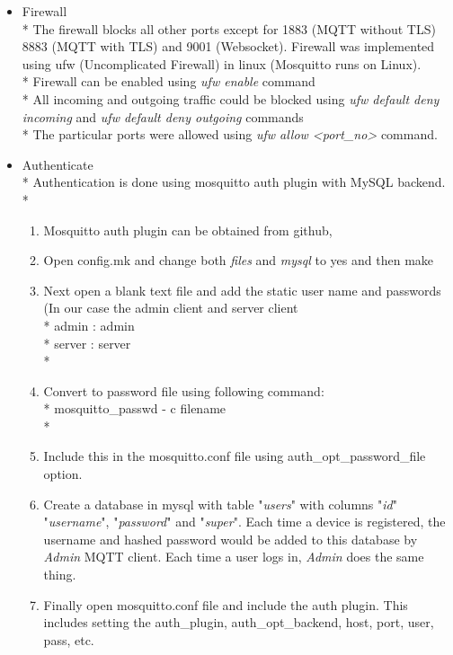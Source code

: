 \documentclass{report}
\begin{document}
\begin{itemize}
    \item Firewall \\* 
    The firewall blocks all other ports except for 1883 (MQTT without TLS) 8883 (MQTT with TLS) and 9001 (Websocket). Firewall was implemented using ufw (Uncomplicated Firewall) in linux (Mosquitto runs on Linux).\\*
    Firewall can be enabled using \textit{ufw enable} command\\*
    All incoming and outgoing traffic could be blocked using \textit{ufw default deny incoming} and \textit{ufw default deny outgoing} commands\\*
    The particular ports were allowed using \textit{ufw allow <port\_no>} command.
    \item Authenticate\\* 
    Authentication is done using mosquitto auth plugin with MySQL backend.\\*
    \begin{enumerate}
        \item Mosquitto auth plugin can be obtained from github,
        \item Open config.mk and change both \textit{files} and \textit{mysql} to yes and then make
        \item Next open a blank text file and add the static user name and passwords (In our case the admin client and server client\\*
        \hspace*{2cm}admin : admin\\*
        \hspace*{2cm}server : server\\*
        \item Convert to password file using following command: \\*
        \hspace*{2cm}mosquitto\_passwd - c filename\\*
        \item Include this in the mosquitto.conf file using auth\_opt\_password\_file option.
        \item Create a database in mysql with table "\textit{users}" with columns "\textit{id}" "\textit{username}", "\textit{password}" and "\textit{super}". Each time a device is registered, the username and hashed password would be added to this database by \textit{Admin} MQTT client. Each time a user logs in, \textit{Admin} does the same thing.
        \item Finally open mosquitto.conf file and include the auth plugin. This includes setting the auth\_plugin, auth\_opt\_backend, host, port, user, pass, etc.
    \end{enumerate}


\end{itemize}
\end{document}
